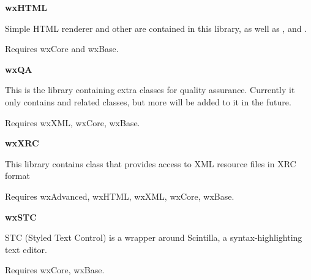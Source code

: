 {\large {\bf wxHTML}}

Simple HTML renderer and other  are
contained in this library, as well as
 ,
  and
 .

Requires wxCore and wxBase.

{\large {\bf wxQA}}

This is the library containing extra classes for quality assurance. Currently
it only contains  and related classes,
but more will be added to it in the future.

Requires wxXML, wxCore, wxBase.

{\large {\bf wxXRC}}

This library contains  class that
provides access to XML resource files in XRC format

Requires wxAdvanced, wxHTML, wxXML, wxCore, wxBase.

{\large {\bf wxSTC}}

STC (Styled Text Control) is a wrapper around Scintilla, a syntax-highlighting text editor.

Requires wxCore, wxBase.
